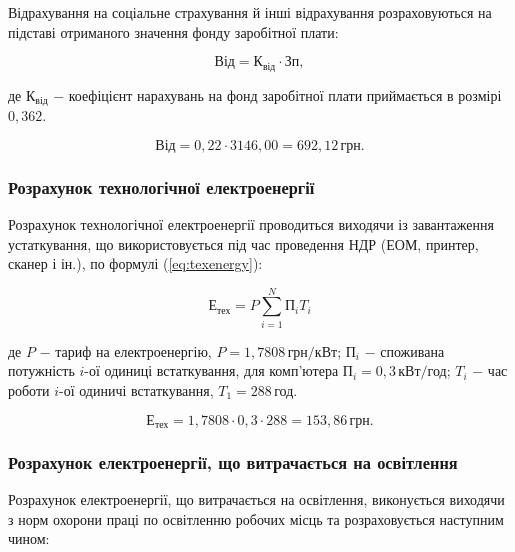 Відрахування на соціальне страхування й інші відрахування розраховуються на підставі отриманого значення фонду заробітної плати:

\begin{equation}\label{eq:soc}
\text{Від} = \text{К}_{\text{від}} \cdot \text{Зп},
\end{equation}


\noindent де $\text{К}_{\text{від}}$ $-$ коефіцієнт нарахувань на фонд заробітної плати приймається в розмірі $0,362$.

\[
\text{Від} = 0,22 \cdot 3146,00 = 692,12 \, \text{грн}.
\]

\vspace{1.5em}

\subsubsection{Розрахунок технологічної електроенергії}

Розрахунок технологічної електроенергії проводиться виходячи із завантаження устаткування, що використовується під час проведення НДР (ЕОМ, принтер, сканер і ін.), по формулі (\ref{eq:texenergy}):

\begin{equation}\label{eq:texenergy}
\text{Е}_{\text{тех}} = P \sum_{i=1}^{N}\text{П}_{i}T_{i}
\end{equation}

\noindent де $P$ $-$ тариф на електроенергію, $P = 1,7808 \, \text{грн}/\text{кВт}$; \newline
\hspace*{15pt} $\text{П}_{i}$ $-$ споживана потужність $i$-ої одиниці встаткування, для комп'ютера $\text{П}_{i} = 0,3 \, \text{кВт}/\text{год}$;\newline
\hspace*{15pt} $T_{i}$ $-$ час роботи $i$-ої одиничі встаткування, $T_{1} = 288 \, \text{год}$.

\[
\text{Е}_{\text{тех}} = 1,7808 \cdot 0,3 \cdot 288 = 153,86 \, \text{грн}.
\]

\vspace{1.5em}

\subsubsection{Розрахунок електроенергії, що витрачається на освітлення}

Розрахунок електроенергії, що витрачається на освітлення, виконується виходячи з норм охорони праці по освітленню робочих місць та розраховується наступним чином:

